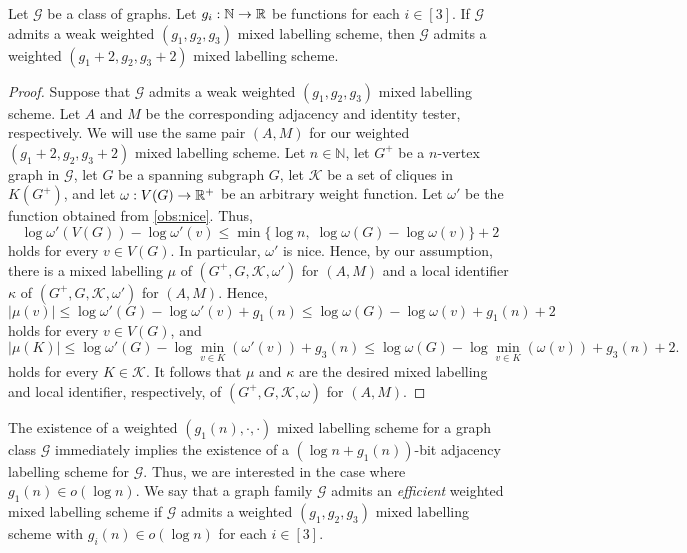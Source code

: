 \documentclass{patmorin}
\renewcommand{\le}{\leqslant}
\renewcommand{\leq}{\leqslant}
\newcommand{\pat}[1]{\textcolor{Magenta}{PaMo: #1}}
\newcommand{\piotr}[1]{\textcolor{red}{PiMi: #1}}
\newcommand{\defin}[1]{\emph{\textcolor{brightmaroon}{#1}}}
\newcommand{\NN}{\mathbb{N}}
\begin{document}
\begin{lem}
    \label{lem:nice_weights}
    Let $\mathcal{G}$ be a class of graphs.
    Let $g_i:\mathbb{N}\to\mathbb{R}$ be functions for each $i\in[3]$.
    If $\mathcal{G}$ admits a weak weighted $(g_1,g_2,g_3)$ mixed labelling scheme, then $\mathcal{G}$ admits a weighted $(g_1+2,g_2,g_3+2)$ mixed labelling scheme. %
\end{lem}
\begin{proof}
    Suppose that $\mathcal{G}$ admits a weak weighted $(g_1,g_2,g_3)$ mixed labelling scheme.
    Let $A$ and $M$ be the corresponding adjacency and identity tester, respectively.
    We will use the same pair $(A, M)$ for our weighted $(g_1+2,g_2,g_3+2)$ mixed labelling scheme.
    Let $n\in \NN$, let $G^+$ be a  $n$-vertex graph  in $\mathcal{G}$, let $G$ be a spanning subgraph $G$, let $\mathcal{K}$ be a set of cliques  in $K(G^+)$, and let $\omega:V(G)\to \mathbb{R}^+$ be an arbitrary weight function.
    Let $\omega'$ be the function obtained from \cref{obs:nice}.
    Thus,
    \[
    \log\omega'(V(G))-\log\omega'(v)\le\min\{\log n,\;\log\omega(G)-\log\omega(v)\}+2
    \]
    holds for every $v\in V(G)$.
    In particular, $\omega'$ is nice.
    Hence, by our assumption, there is a mixed labelling $\mu$ of $(G^+,G,\mathcal{K},\omega')$ for $(A,M)$ and a local identifier $\kappa$ of $(G^+,G,\mathcal{K},\omega')$ for $(A,M)$.
    Hence,
    \[
    |\mu(v)| \leq \log \omega'(G) - \log\omega'(v) + g_1(n) \leq \log \omega(G) - \log\omega(v) + g_1(n) + 2
    \]
    holds for every $v\in V(G)$, and
    \[
    |\mu(K)|\le \log \omega'(G) - \log\min_{v\in K}(\omega'(v)) + g_3(n)
    \leq \log \omega(G) - \log\min_{v\in K}(\omega(v)) + g_3(n) + 2.
    \]
    holds for every $K\in \mathcal{K}$.
    It follows that $\mu$ and  $\kappa$ are the desired  mixed labelling and local identifier, respectively,  of $(G^+,G,\mathcal{K},\omega)$ for $(A,M)$.
\end{proof}


The existence of a weighted $(g_1(n),\cdot,\cdot)$ mixed labelling scheme for a graph class $\mathcal{G}$ immediately implies the existence of a $(\log n+g_1(n))$-bit adjacency labelling scheme for $\mathcal{G}$. Thus, we are interested in the case where $g_1(n)\in o(\log n)$. We say that a graph family $\mathcal{G}$ admits an \defin{efficient} weighted mixed labelling scheme if $\mathcal{G}$ admits a weighted $(g_1,g_2,g_3)$ mixed labelling scheme with $g_i(n)\in o(\log n)$ for each $i\in [3]$.
\end{document}

